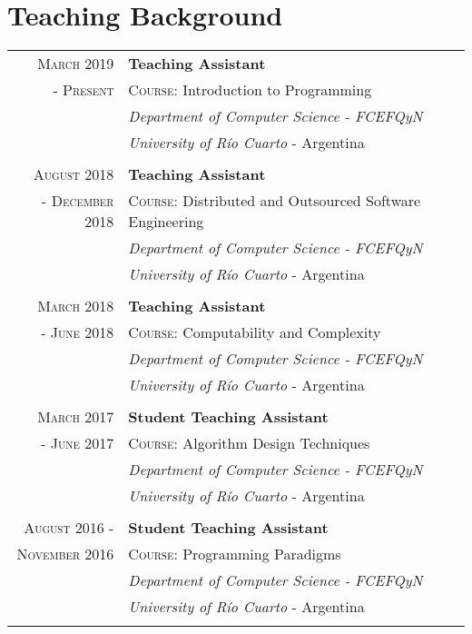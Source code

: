 \documentclass[a4paper,10pt]{article} %
\begin{document}
\section{Teaching Background}
\begin{longtable}{rl}
\textsc{March 2019} & \textbf{Teaching Assistant} \\
\textsc{- Present} & \textsc{Course:} Introduction to Programming \\ 
& \textit{Department of Computer Science - FCEFQyN} \\  
& \textit{University of Río Cuarto} - Argentina \\ & \\

\textsc{August 2018} & \textbf{Teaching Assistant} \\
\textsc{- December 2018} & \textsc{Course:} Distributed and Outsourced Software Engineering \\ 
& \textit{Department of Computer Science - FCEFQyN} \\  
& \textit{University of Río Cuarto} - Argentina \\ & \\

\textsc{March 2018} & \textbf{Teaching Assistant} \\
\textsc{- June 2018} & \textsc{Course:} Computability and Complexity \\ 
& \textit{Department of Computer Science - FCEFQyN} \\  
& \textit{University of Río Cuarto} - Argentina \\ & \\

\textsc{March 2017} & \textbf{Student Teaching Assistant} \\
\textsc{- June 2017} & \textsc{Course:} Algorithm Design Techniques \\ 
& \textit{Department of Computer Science - FCEFQyN} \\  
& \textit{University of Río Cuarto} - Argentina \\ & \\

\textsc{August 2016 -} & \textbf{Student Teaching Assistant} \\
\textsc{November 2016} & \textsc{Course:} Programming Paradigms \\ & \textit{Department of Computer Science - FCEFQyN} \\  
& \textit{University of Río Cuarto} - Argentina \\ & \\


\end{longtable}
\end{document}

